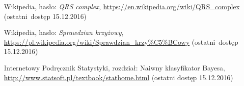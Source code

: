 \documentclass[12pt]{article}
\begin{document}
 






\begin{thebibliography}{5}
	Wikipedia, hasło: \textit{QRS complex},
	\url{https://en.wikipedia.org/wiki/QRS_complex}
	(ostatni~dostęp 15.12.2016)

	Wikipedia, hasło: \textit{Sprawdzian krzyżowy},
	\url{https://pl.wikipedia.org/wiki/Sprawdzian_krzy%C5%BCowy}
	(ostatni~dostęp 15.12.2016)
	
	Internetowy Podręcznik Statystyki, rozdział: Naiwny klasyfikator Bayesa,
	\url{http://www.statsoft.pl/textbook/stathome.html}
	(ostatni dostęp 15.12.2016)

\end{thebibliography}
\end{document}
